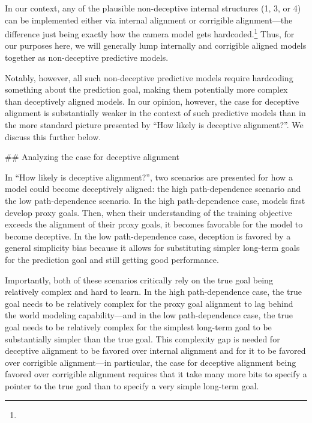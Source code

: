 {In our context, any of the plausible non-deceptive internal structures (1, 3, or 4) can be implemented either via internal alignment or corrigible alignment---the difference just being exactly how the camera model gets hardcoded.\footnote{} Thus, for our purposes here, we will generally lump internally and corrigible aligned models together as non-deceptive predictive models.

Notably, however, all such non-deceptive predictive models require hardcoding something about the prediction goal, making them potentially more complex than deceptively aligned models. In our opinion, however, the case for deceptive alignment is substantially weaker in the context of such predictive models than in the more standard picture presented by ``How likely is deceptive alignment?\cite{TODO: cite https://www.alignmentforum.org/posts/A9NxPTwbw6r6Awuwt/how-likely-is-deceptive-alignment}''. We discuss this further below.


## Analyzing the case for deceptive alignment

In ``How likely is deceptive alignment?\cite{TODO: cite https://www.alignmentforum.org/posts/A9NxPTwbw6r6Awuwt/how-likely-is-deceptive-alignment}'', two scenarios are presented for how a model could become deceptively aligned: the high path-dependence scenario and the low path-dependence scenario. In the high path-dependence case, models first develop proxy goals. Then, when their understanding of the training objective exceeds the alignment of their proxy goals, it becomes favorable for the model to become deceptive. In the low path-dependence case, deception is favored by a general simplicity bias because it allows for substituting simpler long-term goals for the prediction goal and still getting good performance.

Importantly, both of these scenarios critically rely on the true goal being relatively complex and hard to learn. In the high path-dependence case, the true goal needs to be relatively complex for the proxy goal alignment to lag behind the world modeling capability---and in the low path-dependence case, the true goal needs to be relatively complex for the simplest long-term goal to be substantially simpler than the true goal. This complexity gap is needed for deceptive alignment to be favored over internal alignment and for it to be favored over corrigible alignment---in particular, the case for deceptive alignment being favored over corrigible alignment requires that it take many more bits to specify a pointer to the true goal than to specify a very simple long-term goal.

}
